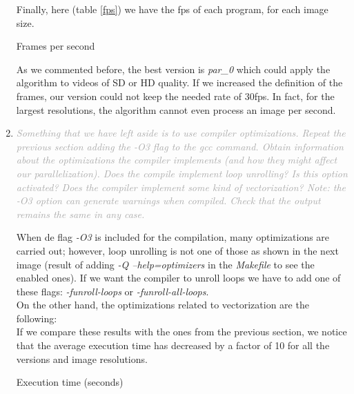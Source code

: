 \documentclass{article}
\newcommand{\greyItem}[1]{\item\emph{\textcolor{darkgray}{#1}}}
\begin{document}
\begin{enumerate}[label=5.\arabic*,leftmargin=*]
\pagebreak

Finally, here (table \ref{fps}) we have the fps of each program, for each image size.

\begin{table}[h]
    
    \centering
    \caption{Frames per second}
    \label{fps}
\end{table}

As we commented before, the best version is \emph{par\_0} which could apply the algorithm to videos of SD or HD quality. If we increased the definition of the frames, our version could not keep the needed rate of 30fps. In fact, for the largest resolutions, the algorithm cannot even process an image per second.

\pagebreak

\greyItem{Something that we have left aside is to use compiler optimizations. Repeat the previous section adding the -O3 flag to the gcc command. Obtain information about the optimizations the compiler implements (and how they might affect our parallelization). Does the compile implement loop unrolling? Is this option activated? Does the compiler implement some kind of vectorization? Note: the -O3 option can generate warnings when compiled. Check that the output remains the same in any case.}


When de flag \emph{-O3} is included for the compilation, many optimizations are carried out; however, loop unrolling is not one of those as shown in the next image (result of adding \emph{-Q --help=optimizers} in the \emph{Makefile} to see the enabled ones). If we want the compiler to unroll loops we have to add one of these flags: \emph{-funroll-loops} or \emph{-funroll-all-loops}.\\



On the other hand, the optimizations related to vectorization are the following:\\



If we compare these results with the ones from the previous section, we notice that the average execution time has decreased by a factor of 10 for all the versions and image resolutions.


\begin{table}[h]
    
    \centering
    \caption{Execution time (seconds)}
\end{table}


\end{enumerate}
\end{document}
